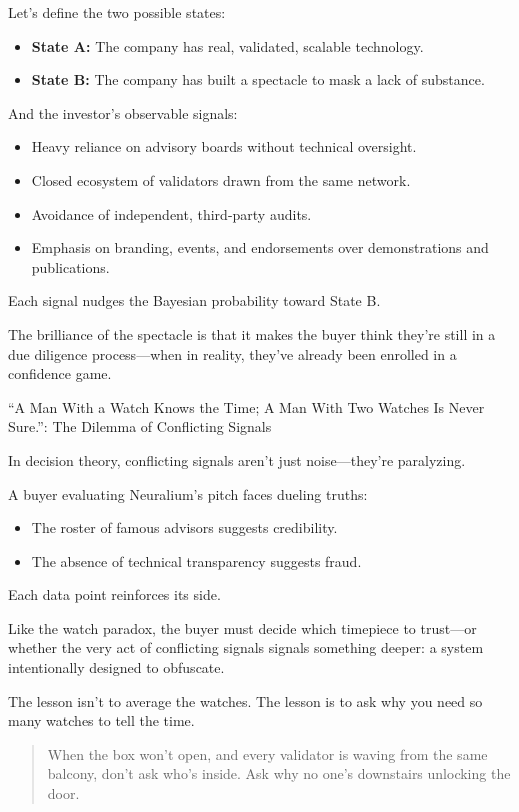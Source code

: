 Let’s define the two possible states:

\begin{itemize}
  \item \textbf{State A:} The company has real, validated, scalable technology.
  \item \textbf{State B:} The company has built a spectacle to mask a lack of substance.
\end{itemize}

And the investor’s observable signals:

\begin{itemize}
  \item Heavy reliance on advisory boards without technical oversight.
  \item Closed ecosystem of validators drawn from the same network.
  \item Avoidance of independent, third-party audits.
  \item Emphasis on branding, events, and endorsements over demonstrations and publications.
\end{itemize}

Each signal nudges the Bayesian probability toward State B.

The brilliance of the spectacle is that it makes the buyer think they’re still in a due diligence process—when in reality, they’ve already been enrolled in a confidence game.

\medskip

\begin{HistoricalSidebar}{“A Man With a Watch Knows the Time; A Man With Two Watches Is Never Sure.”: The Dilemma of Conflicting Signals}

  In decision theory, conflicting signals aren’t just noise—they’re paralyzing.

  \medskip
  
  A buyer evaluating Neuralium’s pitch faces dueling truths:
  
  \begin{itemize}
    \item The roster of famous advisors suggests credibility.
    \item The absence of technical transparency suggests fraud.
  \end{itemize}

  Each data point reinforces its side.

  Like the watch paradox, the buyer must decide which timepiece to trust—or whether the very act of conflicting signals signals something deeper: a system intentionally designed to obfuscate.

  \medskip

  The lesson isn’t to average the watches.  
  The lesson is to ask why you need so many watches to tell the time.

  \medskip

  \begin{quote}
  When the box won’t open, and every validator is waving from the same balcony, don’t ask who’s inside.  
  Ask why no one’s downstairs unlocking the door.
  \end{quote}

\end{HistoricalSidebar}

